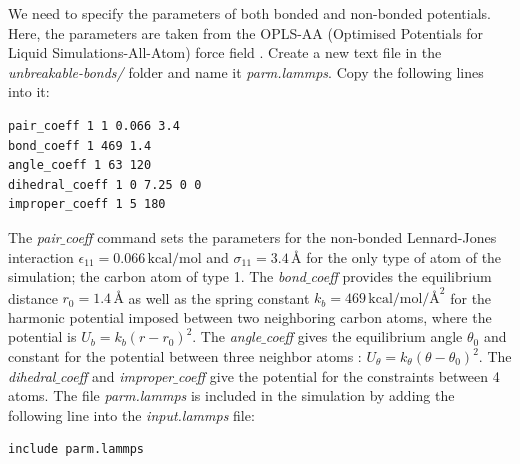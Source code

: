 \documentclass[9pt,tutorial]{livecoms}
\begin{document}
We need to specify the parameters of both bonded and non-bonded potentials. Here, the parameters are taken from the OPLS-AA (Optimised Potentials for Liquid Simulations-All-Atom) force field \cite{jorgensenDevelopmentTestingOPLS1996}. Create a new text file in the \textit{unbreakable-bonds/} folder and name it \textit{parm.lammps}. Copy the following lines into it:
{\normalsize \begin{verbatim}
pair_coeff 1 1 0.066 3.4
bond_coeff 1 469 1.4
angle_coeff 1 63 120
dihedral_coeff 1 0 7.25 0 0
improper_coeff 1 5 180
\end{verbatim}}
The \textit{pair$\_$coeff} command sets the parameters for the non-bonded Lennard-Jones interaction $\epsilon_{11} = 0.066 \, \text{kcal/mol}$ and $\sigma_{11} = 3.4 \, \text{\AA{}}$ for the only type of atom of the simulation; the carbon atom of type 1.  The \textit{bond$\_$coeff} provides the equilibrium distance $r_0= 1.4 \, \text{\AA{}}$ as well as the spring constant $k_b = 469 \, \text{kcal/mol/\AA{}}^2$ for the harmonic potential imposed between two neighboring carbon atoms, where the potential is $U_b = k_b ( r - r_0)^2$. The
\textit{angle$\_$coeff} gives the equilibrium angle $\theta_0$ and constant for the potential between three neighbor atoms :
$U_\theta = k_\theta ( \theta - \theta_0)^2$. The \textit{dihedral$\_$coeff} and \textit{improper$\_$coeff} give the potential for the constraints between 4 atoms. The file \textit{parm.lammps} is included in the simulation by adding the following line into the \textit{input.lammps} file:
{\normalsize \begin{verbatim}
include parm.lammps
\end{verbatim}}
\end{document}
